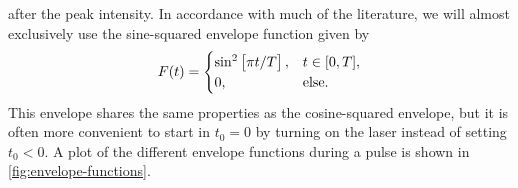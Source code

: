             after the peak intensity.
            In accordance with much of the literature, we will almost
            exclusively use the sine-squared envelope function given by
            \begin{align}
                F(t) = \begin{cases}
                    \sin^2\left[ 
                        \pi t / T
                     \right], & t \in [0, T], \\
                    0, & \text{else}.
                \end{cases}
            \end{align}
            This envelope shares the same properties as the cosine-squared
            envelope, but it is often more convenient to start in $t_0 = 0$ by
            turning on the laser instead of setting $t_0 < 0$.
            A plot of the different envelope functions during a pulse is shown
            in \autoref{fig:envelope-functions}.

